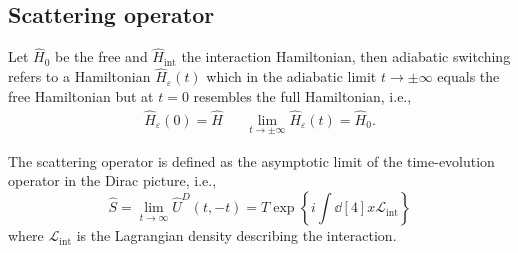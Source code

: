 \subsection{Scattering operator}

\begin{definition}
	Let $\hat{H}_0$ be the free and $\hat{H}_\text{int}$ the interaction Hamiltonian, then adiabatic switching refers to a Hamiltonian $\hat{H}_\varepsilon(t)$ which in the adiabatic limit $t\to\pm\infty$ equals the free Hamiltonian but at $t=0$ resembles the full Hamiltonian, i.e.,
	\begin{align}
		\hat{H}_\varepsilon(0)
		=
		\hat{H}
		&&
		\lim_{t\to\pm\infty}
		\hat{H}_\varepsilon(t)
		=
		\hat{H}_0
		.
	\end{align}
\end{definition}
\begin{definition}\label{thm:scattering_operator}
	The scattering operator is defined as the asymptotic limit of the time-evolution operator in the Dirac picture, i.e.,
	\begin{equation}
		\hat{S}
		=
		\lim_{t\to\infty}
		\hat{U}^D(t,-t)
		=
		T\exp\left\{
			i\int\dd[4]{x}
			\mathcal{L}_\text{int}
		\right\}
	\end{equation}
	where $\mathcal{L}_\text{int}$ is the Lagrangian density describing the interaction.
\end{definition}
